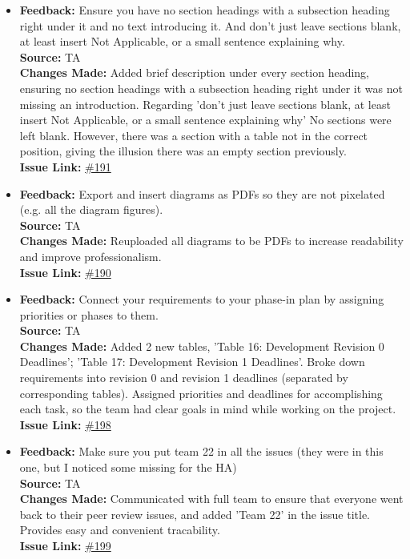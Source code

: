 \documentclass{article}
\begin{document}
\begin{itemize}
  \item 
    \textbf{Feedback:} Ensure you have no section headings with a subsection heading right under it and no text introducing it. And don't just leave sections blank, at least insert Not Applicable, or a small sentence explaining why. \\
    \textbf{Source:} TA \\
    \textbf{Changes Made:} Added brief description under every section heading, ensuring no section headings with a subsection heading right under it was not missing an introduction. Regarding 'don't just leave sections blank, at least insert Not Applicable, or a small sentence explaining why' No sections were left blank. However, there was a section with a table not in the correct position, giving the illusion there was an empty section previously.\\
    \textbf{Issue Link:} \href{https://github.com/parishanizam/TeleHealth/issues/191}{\#191}

  \item 
    \textbf{Feedback:} Export and insert diagrams as PDFs so they are not pixelated (e.g. all the diagram figures). \\
    \textbf{Source:} TA \\
    \textbf{Changes Made:} Reuploaded all diagrams to be PDFs to increase readability and improve professionalism.\\
    \textbf{Issue Link:} \href{https://github.com/parishanizam/TeleHealth/issues/190}{\#190}

  \item 
    \textbf{Feedback:} Connect your requirements to your phase-in plan by assigning priorities or phases to them. \\
    \textbf{Source:} TA \\
    \textbf{Changes Made:} Added 2 new tables, 'Table 16: Development Revision 0 Deadlines'; 'Table 17: Development Revision 1 Deadlines'. Broke down requirements into revision 0 and revision 1 deadlines (separated by corresponding tables).
    Assigned priorities and deadlines for accomplishing each task, so the team had clear goals in mind while working on the project.\\
    \textbf{Issue Link:} \href{https://github.com/parishanizam/TeleHealth/issues/198}{\#198}

  \item 
    \textbf{Feedback:} Make sure you put team 22 in all the issues (they were in this one, but I noticed some missing for the HA) \\
    \textbf{Source:} TA \\
    \textbf{Changes Made:} Communicated with full team to ensure that everyone went back to their peer review issues, and added 'Team 22' in the issue title. Provides easy and convenient tracability.\\
    \textbf{Issue Link:} \href{https://github.com/parishanizam/TeleHealth/issues/199}{\#199}


\end{itemize}
\end{document}
